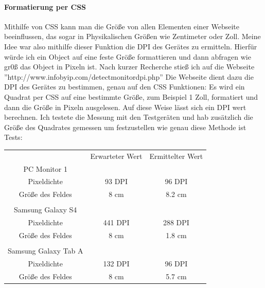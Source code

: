 \paragraph{Formatierung per CSS} 
Mithilfe von CSS kann man die Größe von allen Elementen einer Webseite beeinflussen, das sogar in Physikalischen Größen wie Zentimeter oder Zoll. Meine Idee war also mithilfe dieser Funktion die DPI des Gerätes zu ermitteln.
\newline
Hierfür würde ich ein Object auf eine feste Größe formattieren und dann abfragen wie gr0ß das Object in Pixeln ist.
\newline
\newline
Nach kurzer Recherche stieß ich auf die Webseite ''http://www.infobyip.com/detectmonitordpi.php''
\newline
Die Webseite dient dazu die DPI des Gerätes zu bestimmen, genau auf den CSS Funktionen: Es wird ein Quadrat per CSS auf eine bestimmte Größe, zum Beispiel 1 Zoll, formatiert und dann die Größe in Pixeln ausgelesen. Auf diese Weise lässt sich ein DPI wert berechnen.
\newline
Ich testete die Messung mit den Testgeräten und hab zusätzlich die Größe des Quadrates gemessen um festzustellen wie genau diese Methode ist
\newline
	      \newline
	      Tests:
	      \newline
	      \begin{tabular}{ccc}
	      	                     & Erwarteter Wert & Ermittelter Wert           \\
	      	PC Monitor 1         &                 &                            \\
	      	Pixeldichte          & 93 DPI          & \colorbox{red!30}{96 DPI}  \\
	      	Größe des Feldes     & 8 cm            & \colorbox{red!30}{8.2 cm}  \\
	      	                     &                 &                            \\
	      	Samsung Galaxy S4    &                 &                            \\
	      	Pixeldichte          & 441 DPI         & \colorbox{red!30}{288 DPI} \\
	      	Größe des Feldes     & 8 cm            & \colorbox{red!30}{1.8 cm}  \\
	      	                     &                 &                            \\
	      	Samsung Galaxy Tab A &                 &                            \\
	      	Pixeldichte          & 132 DPI         & \colorbox{red!30}{96 DPI}  \\
	      	Größe des Feldes     & 8 cm            & \colorbox{red!30}{5.7 cm}  \\
	      \end{tabular}
